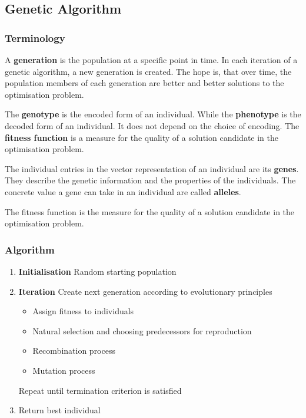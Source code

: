 \documentclass[11pt]{article}
\begin{document}
\subsection{Genetic Algorithm}

\subsubsection{Terminology}
A \textbf{generation} is the population at a specific point in time. In each iteration of a genetic algorithm, a new generation is created. The hope is, that over time, the population members of each generation are better and better solutions to the optimisation problem.

The \textbf{genotype} is the encoded form of an individual. While the \textbf{phenotype} is the decoded form of an individual. It does not depend on the choice of encoding. The \textbf{fitness function} is a measure for the quality of a solution candidate in the optimisation problem.

The individual entries in the vector representation of an individual are its \textbf{genes}. They describe the genetic information and the properties of the individuals. The concrete value a gene can take in an individual are called \textbf{alleles}.

The fitness function is the measure for the quality of a solution candidate in the optimisation problem.

\subsubsection{Algorithm}

\begin{enumerate}
	\item \textbf{Initialisation} Random starting population
	\item \textbf{Iteration} Create next generation according to evolutionary principles
	\begin{itemize}
		\item Assign fitness to individuals
		\item Natural selection and choosing predecessors for reproduction
		\item Recombination process
		\item Mutation process
	\end{itemize}
	Repeat until termination criterion is satisfied
	\item Return best individual
\end{enumerate}
\end{document}
